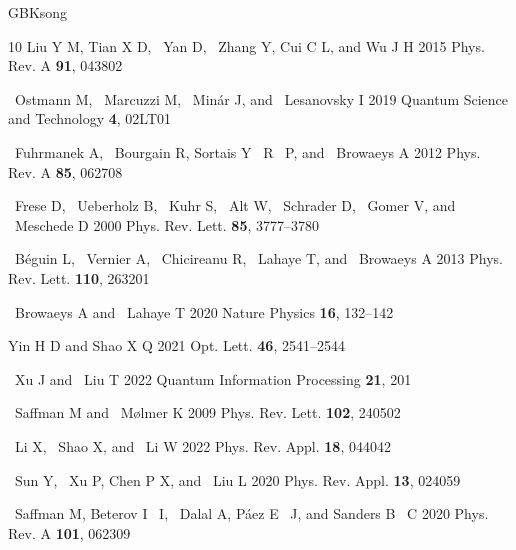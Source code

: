 \documentclass{cpbtex}
\begin{document}
\begin{CJK*}{GBK}{song}
\begin{thebibliography}{10}
Liu Y M, Tian X D, ~Yan D, ~Zhang Y, Cui C L, and Wu J H 2015 {{Phys. Rev. A}}
  \textbf{91}, 043802

~Ostmann M, ~Marcuzzi M, ~Min{\'{a}}r J, and ~Lesanovsky I 2019 {{Quantum Science and Technology}} \textbf{4}, 02LT01

~Fuhrmanek A, ~Bourgain R, Sortais Y ~R ~P, and ~Browaeys A 2012 {{Phys. Rev. A}} \textbf{85}, 062708

~Frese D, ~Ueberholz B, ~Kuhr S, ~Alt W, ~Schrader D, ~Gomer V, and
  ~Meschede D 2000 {{Phys. Rev.
  Lett.}} \textbf{85}, 3777--3780

~B\'eguin L, ~Vernier A, ~Chicireanu R, ~Lahaye T, and ~Browaeys A 2013 {{Phys. Rev. Lett.}} \textbf{110}, 263201 

~Browaeys A and ~Lahaye T 2020 {{Nature Physics}}
  \textbf{16}, 132--142 

Yin H D and Shao X Q 2021 {{Opt. Lett.}} \textbf{46}, 2541--2544 

~Xu J and ~Liu T 2022 {{Quantum Information Processing}} \textbf{21}, 201
  
~Saffman M and ~M\o{}lmer K 2009 {{Phys. Rev. Lett.}}
  \textbf{102}, 240502

~Li X, ~Shao X, and ~Li W 2022 {{Phys. Rev. Appl.}} \textbf{18}, 044042

~Sun Y, ~Xu P, Chen P X, and ~Liu L 2020 {{Phys. Rev. Appl.}} \textbf{13}, 024059

~Saffman M, Beterov I ~I, ~Dalal A, P\'aez E ~J, and Sanders B ~C 2020 {{Phys. Rev. A}} \textbf{101}, 062309

\end{thebibliography}
\newpage


\end{CJK*}  %
\end{document}
